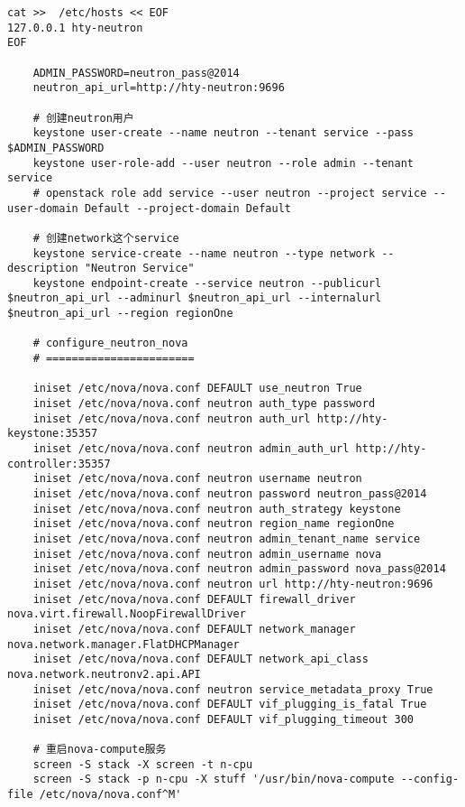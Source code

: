\documentclass[a4paper,left=1.5cm,right=1.5cm,11pt]{article}
\begin{document}
\begin{lstlisting}
cat >>  /etc/hosts << EOF
127.0.0.1 hty-neutron
EOF

	ADMIN_PASSWORD=neutron_pass@2014
	neutron_api_url=http://hty-neutron:9696

	# 创建neutron用户
	keystone user-create --name neutron --tenant service --pass $ADMIN_PASSWORD
	keystone user-role-add --user neutron --role admin --tenant service
	# openstack role add service --user neutron --project service --user-domain Default --project-domain Default

	# 创建network这个service
	keystone service-create --name neutron --type network --description "Neutron Service"
	keystone endpoint-create --service neutron --publicurl $neutron_api_url --adminurl $neutron_api_url --internalurl $neutron_api_url --region regionOne

	# configure_neutron_nova
	# =======================

	iniset /etc/nova/nova.conf DEFAULT use_neutron True
	iniset /etc/nova/nova.conf neutron auth_type password
	iniset /etc/nova/nova.conf neutron auth_url http://hty-keystone:35357
	iniset /etc/nova/nova.conf neutron admin_auth_url http://hty-controller:35357
	iniset /etc/nova/nova.conf neutron username neutron
	iniset /etc/nova/nova.conf neutron password neutron_pass@2014
	iniset /etc/nova/nova.conf neutron auth_strategy keystone
	iniset /etc/nova/nova.conf neutron region_name regionOne
	iniset /etc/nova/nova.conf neutron admin_tenant_name service
	iniset /etc/nova/nova.conf neutron admin_username nova
	iniset /etc/nova/nova.conf neutron admin_password nova_pass@2014
	iniset /etc/nova/nova.conf neutron url http://hty-neutron:9696
	iniset /etc/nova/nova.conf DEFAULT firewall_driver nova.virt.firewall.NoopFirewallDriver
	iniset /etc/nova/nova.conf DEFAULT network_manager nova.network.manager.FlatDHCPManager
	iniset /etc/nova/nova.conf DEFAULT network_api_class nova.network.neutronv2.api.API
	iniset /etc/nova/nova.conf neutron service_metadata_proxy True
	iniset /etc/nova/nova.conf DEFAULT vif_plugging_is_fatal True
	iniset /etc/nova/nova.conf DEFAULT vif_plugging_timeout 300

	# 重启nova-compute服务
	screen -S stack -X screen -t n-cpu
	screen -S stack -p n-cpu -X stuff '/usr/bin/nova-compute --config-file /etc/nova/nova.conf^M'
	\end{lstlisting}
\end{document}

